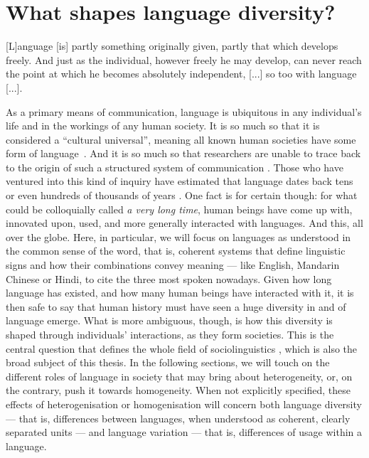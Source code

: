 \documentclass[../thesis.tex]{subfiles}
\begin{document}
\chapter{What shapes language diversity?}
\label{ch:origins_lang_diversity}
 
\epigraph{
  [L]anguage [is] partly something originally given, partly that which develops
  freely. And just as the individual, however freely he may develop, can never reach the
  point at which he becomes absolutely independent, [...]
  so too with language [...].
 }{
}

As a primary means of communication, language is ubiquitous in any individual's life and
in the workings of any human society. It is so much so that it is considered a
``cultural universal'', meaning all known human societies have some form of
language~\cite{GreenbergLanguageUniversals2020,BrownDonaldHumanUniversals1991,}. And it
is so much so that researchers are unable to trace back to the origin of such a
structured system of communication
\cite{MullerLectureIX1861,StamInquiriesOrigin1976,GibsonOxfordHandbook2011,HauserMysteryLanguage2014}.
Those who have ventured into this kind of inquiry have estimated that language dates
back tens or even hundreds of thousands of years
\cite{NicholsOriginDispersal1998,ChomskyLanguageMind2004,BothaCradleLanguage2009,DediuAntiquityLanguage2013}.
One fact is for certain though: for what could be colloquially called \emph{a very long
time}, human beings have come up with, innovated upon, used, and more generally
interacted with languages. And this, all over the globe. Here, in particular, we will
focus on languages as understood in the common sense of the word, that is, coherent
systems that define linguistic signs and how their combinations convey meaning --- like
English, Mandarin Chinese or Hindi, to cite the three most spoken nowadays. Given how
long language has existed, and how many human beings have interacted with it, it is then
safe to say that human history must have seen a huge diversity in and of language
emerge. What is more ambiguous, though, is how this diversity is shaped through
individuals' interactions, as they form societies. This is the central question that
defines the whole field of sociolinguistics
\cite{LabovSociolinguisticPatterns1973,TrudgillSociolinguisticsIntroduction2000,ChambersSociolinguisticTheory2007,WardhaughIntroductionSociolinguistics2008,LabovPrinciplesLinguistic2001},
which is also the broad subject of this thesis. In the following sections, we will touch
on the different roles of language in society that may bring about heterogeneity, or, on
the contrary, push it towards homogeneity. When not explicitly specified, these effects
of heterogenisation or homogenisation will concern both language diversity --- that is,
differences between languages, when understood as coherent, clearly separated units --- and
language variation --- that is, differences of usage within a language.
\end{document}
